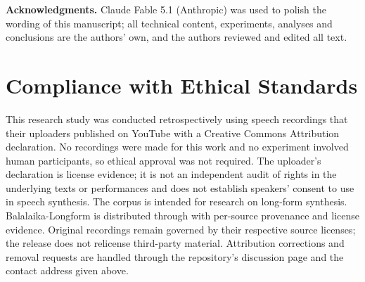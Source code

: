 \documentclass{article}
\newcommand{\corpus}{Balalaika-Longform}
\begin{document}
\medskip\noindent\textbf{Acknowledgments.} Claude Fable 5.1 (Anthropic) was
used to polish the wording of this manuscript; all technical content,
experiments, analyses and conclusions are the authors' own, and the authors
reviewed and edited all text.
\label{sec:contentend}

\clearpage
\section{Compliance with Ethical Standards}

This research study was conducted retrospectively using speech recordings that
their uploaders published on YouTube with a Creative Commons Attribution
declaration.  No recordings were made for this work and no experiment involved
human participants, so ethical approval was not required.  The uploader's
declaration is license evidence; it is not an independent audit of rights in the
underlying texts or performances and does not establish speakers' consent to use
in speech synthesis.  The corpus is intended for research on long-form synthesis.  \corpus{} is distributed
through \datasetlink{} with per-source provenance and license evidence.
Original recordings remain governed by their respective source licenses; the
release does not relicense third-party material.  Attribution corrections and
removal requests are handled through the repository's discussion page and the
contact address given above.



\end{document}
